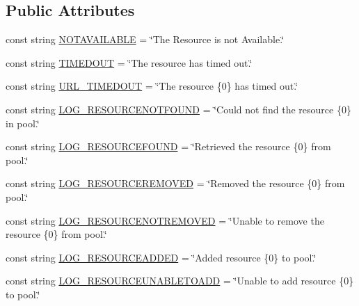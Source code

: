 \subsection*{Public Attributes}
\begin{DoxyCompactItemize}
\item 
const string \mbox{\hyperlink{class_concord_1_1_c3_http_module_1_1_constants_a44e8f4fdf47d3b0e85f667d9a685e87c}{N\+O\+T\+A\+V\+A\+I\+L\+A\+B\+LE}} = \char`\"{}The Resource is not Available.\char`\"{}
\item 
const string \mbox{\hyperlink{class_concord_1_1_c3_http_module_1_1_constants_a9b31254a03dfa9453e52df0519f3671c}{T\+I\+M\+E\+D\+O\+UT}} = \char`\"{}The resource has timed out.\char`\"{}
\item 
const string \mbox{\hyperlink{class_concord_1_1_c3_http_module_1_1_constants_ac4f285e7b8206120e160fe11900c967a}{U\+R\+L\+\_\+\+T\+I\+M\+E\+D\+O\+UT}} = \char`\"{}The resource \{0\} has timed out.\char`\"{}
\item 
const string \mbox{\hyperlink{class_concord_1_1_c3_http_module_1_1_constants_a1c78cace485bdb297fbbf5ed48f5e4c3}{L\+O\+G\+\_\+\+R\+E\+S\+O\+U\+R\+C\+E\+N\+O\+T\+F\+O\+U\+ND}} = \char`\"{}Could not find the resource \{0\} in pool.\char`\"{}
\item 
const string \mbox{\hyperlink{class_concord_1_1_c3_http_module_1_1_constants_af65fb44f7b54dc8ec86e602d44d74738}{L\+O\+G\+\_\+\+R\+E\+S\+O\+U\+R\+C\+E\+F\+O\+U\+ND}} = \char`\"{}Retrieved the resource \{0\} from pool.\char`\"{}
\item 
const string \mbox{\hyperlink{class_concord_1_1_c3_http_module_1_1_constants_a5fc09b46107dc009470263e140c86d05}{L\+O\+G\+\_\+\+R\+E\+S\+O\+U\+R\+C\+E\+R\+E\+M\+O\+V\+ED}} = \char`\"{}Removed the resource \{0\} from pool.\char`\"{}
\item 
const string \mbox{\hyperlink{class_concord_1_1_c3_http_module_1_1_constants_ae0e67f6e0d85082eac6d762fa3dbe4a7}{L\+O\+G\+\_\+\+R\+E\+S\+O\+U\+R\+C\+E\+N\+O\+T\+R\+E\+M\+O\+V\+ED}} = \char`\"{}Unable to remove the resource \{0\} from pool.\char`\"{}
\item 
const string \mbox{\hyperlink{class_concord_1_1_c3_http_module_1_1_constants_a4a2c75775d3281c009b7823ef33bb6d5}{L\+O\+G\+\_\+\+R\+E\+S\+O\+U\+R\+C\+E\+A\+D\+D\+ED}} = \char`\"{}Added resource \{0\} to pool.\char`\"{}
\item 
const string \mbox{\hyperlink{class_concord_1_1_c3_http_module_1_1_constants_a02c3a593b6498124afc3721f3f5c4299}{L\+O\+G\+\_\+\+R\+E\+S\+O\+U\+R\+C\+E\+U\+N\+A\+B\+L\+E\+T\+O\+A\+DD}} = \char`\"{}Unable to add resource \{0\} to pool.\char`\"{}

\end{DoxyCompactItemize}
